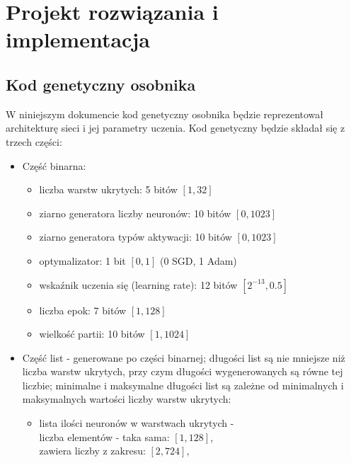 \section{Projekt rozwiązania i implementacja}
\subsection{Kod genetyczny osobnika}
W niniejszym dokumencie kod genetyczny osobnika będzie reprezentował
architekturę sieci i jej parametry uczenia.
Kod genetyczny będzie składał się z trzech części:
\begin{itemize}
  \item Część binarna:
    \begin{itemize}
      \item liczba warstw ukrytych: 5 bitów $\left[1, 32\right]$
      \item ziarno generatora liczby neuronów: 10 bitów $\left[0, 1023\right]$
      \item ziarno generatora typów aktywacji: 10 bitów $\left[0, 1023\right]$
      \item optymalizator: 1 bit $\left[0, 1\right]$ (0 \textrightarrow SGD, 1 \textrightarrow Adam)
      \item wskaźnik uczenia się (learning rate): 12 bitów $\left[2^{-13}, 0.5\right]$
      \item liczba epok: 7 bitów $\left[1, 128\right]$
      \item wielkość partii: 10 bitów $\left[1, 1024\right]$
    \end{itemize}
  \item Część list - generowane po części binarnej;
    długości list są nie mniejsze niż liczba warstw ukrytych,
    przy czym długości wygenerowanych są równe tej liczbie;
    minimalne i maksymalne długości list są zależne
    od minimalnych i maksymalnych wartości liczby warstw ukrytych:
    \begin{itemize}
      \item lista ilości neuronów w warstwach ukrytych -\\
        \hspace*{1em}liczba elementów - taka sama:
          $\left[1, 128\right]$,\\
        \hspace*{1em}zawiera liczby z zakresu:
          $\left[2, 724\right]$,\\

\end{itemize}
\end{itemize}
